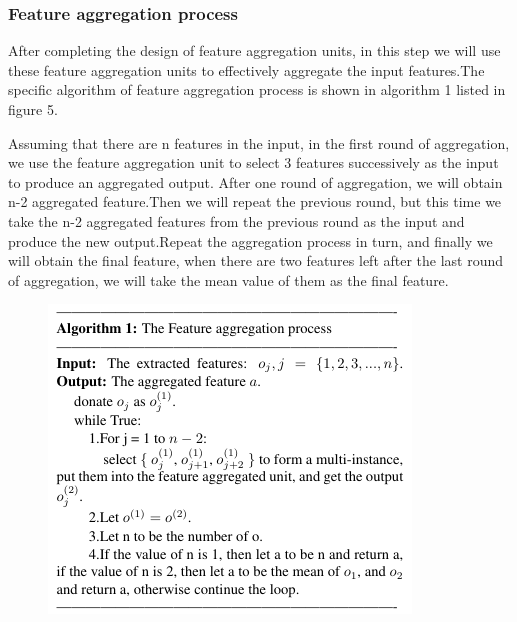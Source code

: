 \documentclass[10pt,twocolumn,letterpaper]{article}
\begin{document}
\subsubsection{Feature aggregation process}
After completing the design of feature aggregation units, in this step we will use these feature aggregation units to effectively aggregate the input features.The specific algorithm of feature aggregation process is shown in algorithm 1 listed in figure 5.

Assuming that there are n features in the input, in the first round of aggregation, we use the feature aggregation unit to select 3 features successively as the input to produce an aggregated output. After one round of aggregation, we will obtain n-2 aggregated feature.Then we will repeat the previous round, but this time we take the n-2 aggregated features from the previous round as the input and produce the new output.Repeat the aggregation process in turn, and finally we will obtain the final feature, when there are two features left after the last round of aggregation, we will take the mean value of them as the final feature.

\begin{figure}[t]
\begin{center}
  \includegraphics[width=1.0\linewidth]{algorithm.png}
\end{center}
\label{fig:long}
\label{fig:onecol}
\end{figure}
\end{document}
